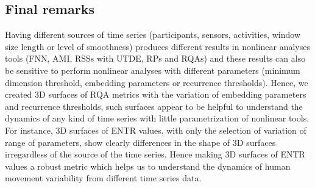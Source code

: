 \subsection{Final remarks}
Having different sources of time series (participants, sensors, 
activities, window size length or level of smoothness) produces different
results in nonlinear analyses tools (FNN, AMI, RSSs with UTDE, RPs and
RQAs) and these results can also be sensitive to perform nonlinear analyses 
with different parameters (minimum dimension threshold, 
embedding parameters or recurrence thresholds).
Hence, we created 3D surfaces of RQA metrics with the 
variation of embedding parameters and recurrence thresholds,
such surfaces appear to be helpful to understand the dynamics 
of any kind of time series with little parametrization of nonlinear tools.
For instance, 
3D surfaces of ENTR values, with only the selection of variation of range 
of parameters, show clearly differences in the shape of 3D surfaces 
irregardless of the source of the time series. Hence making 3D surfaces 
of ENTR values a robust metric which helps us to understand the dynamics 
of human movement variability from different time series data.

